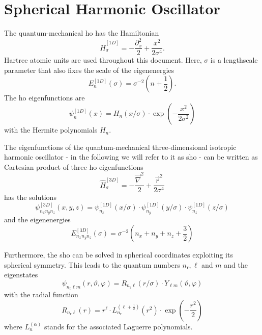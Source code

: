 \documentclass[oribibl]{llncs}
\newcommand{\nrn}{n_{\mathrm{r}}}
\begin{document}
\section{Spherical Harmonic Oscillator} \label{sec:sho}
%
The quantum-mechanical \ac{ho} has the Hamiltonian
\begin{equation}
  \hat H^{[1D]}_{\sigma} = -\frac{\partial_x^2}{2} + \frac{x^2}{2 \sigma^4} \text{.}
  \label{eqn:HO-Hamiltonian}
\end{equation}
Hartree atomic units are used throughout this document.
Here, $\sigma$ is a lengthscale parameter that also fixes the scale of the eigenenergies
\begin{equation}
  E^{[1D]}_{n}(\sigma) = \sigma^{-2} \left( n + \frac 12 \right) \text{.}
  \label{eqn:HO-eigenenergy}
\end{equation}
The \ac{ho} eigenfunctions are
\begin{equation}
  \psi^{[1D]}_{n}(x) = H_n(x/\sigma) \cdot \exp\left( -\frac{x^2}{2 \sigma^2} \right) 
  \label{eqn:HO-eigenfunction}
\end{equation}
with the Hermite polynomials $H_n$.

The eigenfunctions of the quantum-mechanical 
three-dimensional isotropic harmonic oscillator 
- in the following we will refer to it as \ac{sho} -
can be written as Cartesian product of three
\ac{ho} eigenfunctions
\begin{equation}
  \hat H^{[3D]}_{\sigma} = -\frac{\vec \nabla^2}{2} + \frac{\vec r^2}{2 \sigma^{4}} 
  \label{eqn:SHO-Hamiltonian}
\end{equation}
has the solutions
\begin{equation}
  \psi^{[3D]}_{n_x n_y n_z}(x,y,z) = \psi^{[1D]}_{n_x}(x/\sigma) 
                               \cdot \psi^{[1D]}_{n_y}(y/\sigma) 
                               \cdot \psi^{[1D]}_{n_z}(z/\sigma) 
  \label{eqn:SHO-eigenfunction}
\end{equation}
and the eigenenergies
\begin{equation}
  E^{[3D]}_{n_x n_y n_z}(\sigma) = \sigma^{-2} \left( n_x + n_y + n_z + \frac 32 \right) 
  \label{eqn:SHO-eigenenergy}
\end{equation}

Furthermore, the \ac{sho} can be solved in spherical coordinates 
exploiting its spherical symmetry.
This leads to the quantum numbers $\nrn, \ell$ and $m$
and the eigenstates
\begin{equation}
  \psi_{\nrn \ell m}(r,\vartheta,\varphi) = R_{\nrn \ell}(r/\sigma) 
                               \cdot Y_{\ell m}(\vartheta,\varphi)
  \label{eqn:SHO-eigenfunction-radial}
\end{equation}
with the radial function
\begin{equation}
  R_{\nrn \ell}(r) = r^\ell \cdot L^{(\ell + \frac 12)}_{\nrn}(r^2) \cdot \exp(-\frac{r^2}2)
  \label{eqn:SHO-radial-eigenfunction}
\end{equation}
where $L_n^{(\alpha)}$ stands for the associated Laguerre polynomials.
\end{document}
